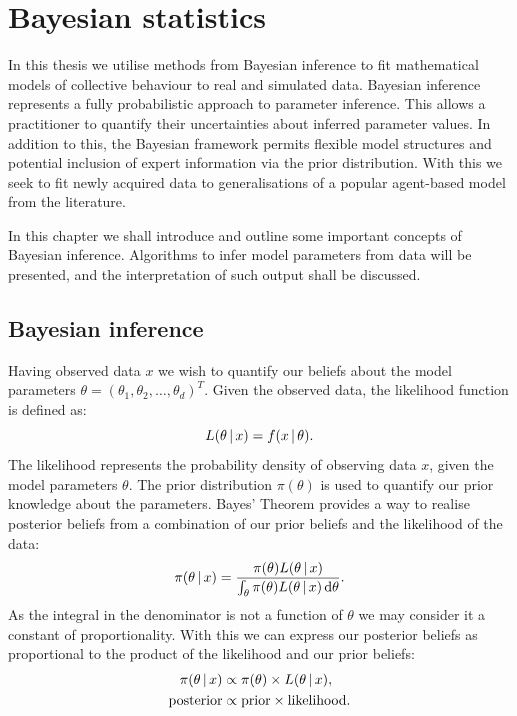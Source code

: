 \graphicspath{{fig/bayes_intro/}}

\chapter{Bayesian statistics}
\label{cha:bayes_intro}

In this thesis we utilise methods from Bayesian inference to fit mathematical models of
collective behaviour to real and simulated data. Bayesian inference represents a fully
probabilistic approach to parameter inference. This allows a practitioner to quantify
their uncertainties about inferred parameter values. In addition to this, the Bayesian
framework permits flexible model structures and potential inclusion of expert information
via the prior distribution. With this we seek to fit newly acquired data to
generalisations of a popular agent-based model from the literature.

In this chapter we shall introduce and outline some important concepts of Bayesian
inference. Algorithms to infer model parameters from data will be presented, and the
interpretation of such output shall be discussed.

\section{Bayesian inference}
\label{sec:bayesian_inference}

Having observed data $x$ we wish to quantify our beliefs about the model parameters
$\theta = (\theta_1,\theta_2,\dots,\theta_d)^T$. Given the observed data, the likelihood
function is defined as:
\begin{equation}
  L(\theta \,|\, x) = f(x \,|\,\theta).
\end{equation}
The likelihood represents the probability density of observing data $x$, given the model
parameters $\theta$. The prior distribution $\pi(\theta)$ is used to quantify our prior
knowledge about the parameters. Bayes' Theorem provides a way to realise posterior
beliefs from a combination of our prior beliefs and the likelihood of the data:
\begin{equation}
  \label{eq:bayes_theorem}
  \pi(\theta \given x) =
    \frac{\pi(\theta) L(\theta\given x)}%
         {\int_{\theta} \pi(\theta) L(\theta\given x) \, \textup{d}\theta}.
\end{equation}
As the integral in the denominator is not a function of $\theta$ we may consider it a
constant of proportionality. With this we can express our posterior beliefs as
proportional to the product of the likelihood and our prior beliefs:
\begin{align*}
  \pi(\theta\,|\, x) & \propto \pi(\theta) \times L(\theta\,|\, x), \\
  \text{posterior}    & \propto \text{prior} \times \text{likelihood}.
\end{align*}

